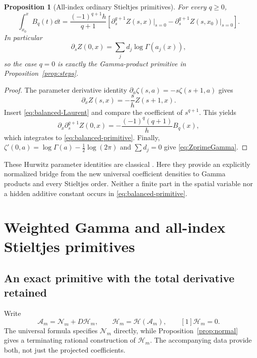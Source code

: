 \documentclass[11pt,letterpaper]{article}
\numberwithin{equation}{section}
\theoremstyle{plain}
\newtheorem{proposition}[theorem]{Proposition}
\theoremstyle{definition}
\theoremstyle{remark}
\newcommand{\Ac}{\mathcal A}\newcommand{\Nc}{\mathcal N}\newcommand{\Hc}{\mathcal H}
\begin{document}
\begin{proposition}[All-index ordinary Stieltjes primitives]\label{prop:balanced-primitives}
For every $q\ge0$,
\begin{equation}\label{eq:balanced-primitive}
 \int_{x_0}^x B_q(t)\dd t
 =\frac{(-1)^{q+1}h}{q+1}
       \left[\partial_s^{q+1}Z(s,x)\big|_{s=0}
             -\partial_s^{q+1}Z(s,x_0)\big|_{s=0}\right].
\end{equation}
In particular
\begin{equation}\label{eq:ZprimeGamma}
 \partial_sZ(0,x)=\sum_jd_j\log\Gamma(a_j(x)),
\end{equation}
so the case $q=0$ is exactly the Gamma-product primitive in Proposition~\ref{prop:steps}.
\end{proposition}
\begin{proof}
The parameter derivative identity $\partial_a\zeta(s,a)=-s\zeta(s+1,a)$ gives
\[
 \partial_xZ(s,x)=-\frac{s}{h}Z(s+1,x).
\]
Insert \eqref{eq:balanced-Laurent} and compare the coefficient of $s^{q+1}$. This yields
\[
 \partial_x\partial_s^{q+1}Z(0,x)
 =-\frac{(-1)^q(q+1)}hB_q(x),
\]
which integrates to \eqref{eq:balanced-primitive}. Finally,
$\zeta'(0,a)=\log\Gamma(a)-\frac12\log(2\pi)$ and $\sum d_j=0$ give \eqref{eq:ZprimeGamma}.
\end{proof}

These Hurwitz parameter identities are classical \cite{DLMFHurwitz}. Here they provide an explicitly normalized bridge from the new universal coefficient densities to Gamma products and every Stieltjes order. Neither a finite part in the spatial variable nor a hidden additive constant occurs in \eqref{eq:balanced-primitive}.



\section{Weighted Gamma and all-index Stieltjes primitives}
\label{sec:primitives}

\subsection{An exact primitive with the total derivative retained}

Write
\[
 \Ac_m=\Nc_m+D\Hc_m,\qquad \Hc_m=\Hc(\Ac_m),
 \qquad [1]\Hc_m=0.
\]
The universal formula specifies $\Nc_m$ directly, while Proposition~\ref{prop:normal} gives a terminating rational construction of $\Hc_m$. The accompanying data provide both, not just the projected coefficients.
\end{document}
